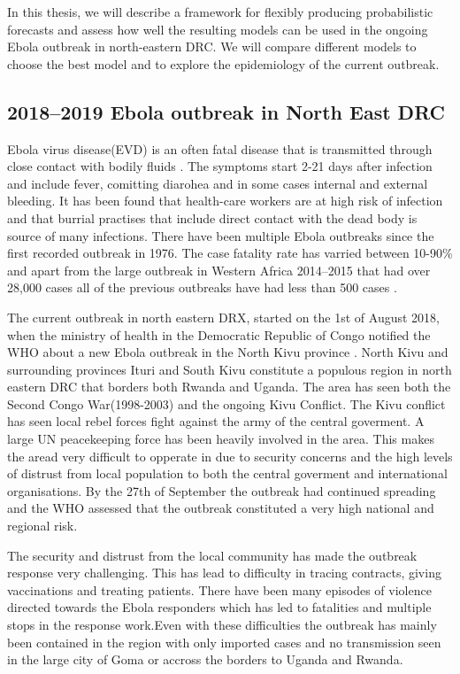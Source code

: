 \documentclass[12pt]{article}
\begin{document}
In this thesis, we will describe a framework for flexibly producing probabilistic forecasts and assess how well the resulting models can be used in the ongoing Ebola outbreak in north-eastern DRC. We will compare different models to choose the best model and to explore the epidemiology of the current outbreak. 

\subsection{2018--2019 Ebola outbreak in North East DRC}

Ebola virus disease(EVD) is an often fatal disease that is transmitted through close contact with bodily fluids \cite{worldhealthorganisationEbolaVirusDisease}. The symptoms start 2-21 days after infection and include fever, comitting diarohea and in some cases internal and external bleeding. It has been found that health-care workers are at high risk of infection and that burrial practises that include direct contact with the dead body is source of many infections\cite{brainardRiskFactorsTransmission2016}. There have been multiple Ebola outbreaks since the first recorded outbreak in 1976. The case fatality rate has varried between 10-90\% and apart from the large outbreak in Western Africa 2014--2015 that had over 28,000 cases all of the previous outbreaks have had less than 500 cases \cite{worldhealthorganisationEbolaVirusDisease}.

The current outbreak in north eastern DRX, started on the 1st of August 2018, when the ministry of health in the Democratic Republic of Congo notified the WHO about a new Ebola outbreak in the North Kivu province \cite{worldhealthorganizationEbolaOutbreakDRC2018a}. North Kivu and surrounding provinces Ituri and South Kivu constitute a populous region in north eastern DRC that borders both Rwanda and Uganda. The area has seen both the Second Congo War(1998-2003) and the ongoing Kivu Conflict. The Kivu conflict has seen local rebel forces fight against the army of the central goverment. A large UN peacekeeping force has been heavily involved in the area. This makes the aread very difficult to opperate in due to security concerns and the high levels of distrust from local population to both the central goverment and international organisations. By the 27th of September the outbreak had continued spreading and the WHO assessed that the outbreak constituted a very high national and regional risk\cite{worldhealthorganizationEbolaOutbreakDRC2018b}.

The security and distrust from the local community has made the outbreak response very challenging. This has lead to difficulty in tracing contracts, giving vaccinations and treating patients. There have been many episodes of violence directed towards the Ebola responders which has led to fatalities and multiple stops in the response work\cite{worldhealthorganizationEbolaOutbreakDRC2018c,worldhealthorganizationEbolaOutbreakDRC2019a}.Even with these difficulties the outbreak has mainly been contained in the region with only imported cases and no transmission seen in the large city of Goma or accross the borders to Uganda and Rwanda. 
\end{document}
